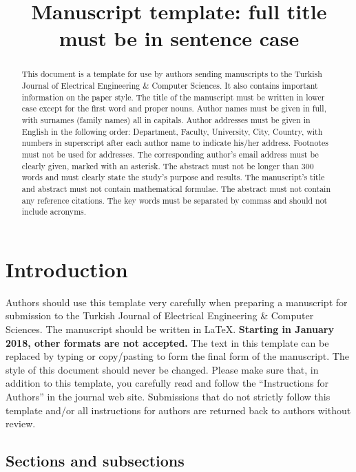 \documentclass{elektr}
\title{Manuscript template: full title must be in sentence case}
\author[]{
	\rec{.202}
	\acc{.202}
	\finv{..202}
}
\begin{document}
\maketitle


\begin{abstract}This document is a template for use by authors sending manuscripts to the Turkish Journal of Electrical Engineering {\&} Computer Sciences. It also contains important information on the paper style. The title of the manuscript must be written in lower case except for the first word and proper nouns. Author names must be given in full, with surnames (family names) all in capitals. Author addresses must be given in English in the following order: Department, Faculty, University, City, Country, with numbers in superscript after each author name to indicate his/her address. Footnotes must not be used for addresses. The corresponding author's email address must be clearly given, marked with an asterisk. The abstract must not be longer than 300 words and must clearly state the study's purpose and results. The manuscript's title and abstract must not contain mathematical formulae. The abstract must not contain any reference citations. The key words must be separated by commas and should not include acronyms.

\end{abstract}

\section{Introduction}
\label{Int}

Authors should use this template very carefully when preparing a manuscript for submission to the Turkish Journal of Electrical Engineering {\&} Computer Sciences. The manuscript should be written in \LaTeX. \textbf{Starting in January 2018, other formats are not accepted.} The text in this template can be replaced by typing or copy/pasting to form the final form of the manuscript. The style of this document should never be changed. Please make sure that, in addition to this template, you carefully read and follow the ``Instructions for Authors'' in the journal web site. Submissions that do not strictly follow this template and/or all instructions for authors are returned back to authors without review.

\subsection{Sections and subsections}
\end{document}
